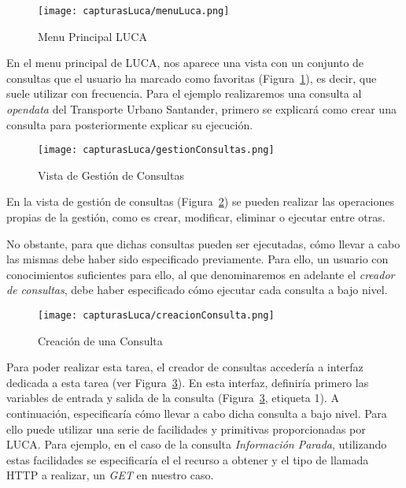 \begin{figure}[!tb]
    \centering
 	\texttt{[image: capturasLuca/menuLuca.png]}
	\caption{Menu Principal LUCA}
    \label{fig:menuLuca}
\end{figure}

En el menu principal de LUCA, nos aparece una vista con un conjunto de consultas que el usuario ha marcado como favoritas (Figura~\ref{fig:menuLuca}), es decir, que suele utilizar con frecuencia. Para el ejemplo realizaremos una consulta al \emph{opendata} del Transporte Urbano Santander, primero se explicará como crear una consulta para posteriormente explicar su ejecución.

\begin{figure}[!tb]
	\centering
	\texttt{[image: capturasLuca/gestionConsultas.png]}
	\caption{Vista de Gestión de Consultas}
	\label{fig:gestionConsultas}
\end{figure}

En la vista de gestión de consultas (Figura~\ref{fig:gestionConsultas}) se pueden realizar las operaciones propias de la gestión, como es crear, modificar, eliminar o ejecutar entre otras.

No obstante, para que dichas consultas pueden ser ejecutadas, cómo llevar a cabo las mismas debe haber sido especificado previamente. Para ello, un usuario con conocimientos suficientes para ello, al que denominaremos en adelante el \emph{creador de consultas}, debe haber especificado cómo ejecutar cada consulta a bajo nivel.

\begin{figure}[!tb]
	\centering
	\texttt{[image: capturasLuca/creacionConsulta.png]}
	\caption{Creación de una Consulta}
	\label{fig:creacionConsulta}
\end{figure}

Para poder realizar esta tarea, el creador de consultas accedería a interfaz dedicada a esta tarea (ver Figura~\ref{fig:creacionConsulta}). En esta interfaz, definiría primero las variables de entrada y salida de la consulta (Figura~\ref{fig:creacionConsulta}, etiqueta 1). A continuación, especificaría cómo llevar a cabo dicha consulta a bajo nivel. Para ello puede utilizar una serie de facilidades y primitivas proporcionadas por LUCA. Para ejemplo, en el caso de la consulta \emph{Información Parada}, utilizando estas facilidades se especificaría el el recurso a obtener y el tipo de llamada HTTP a realizar, un \emph{GET} en nuestro caso.

